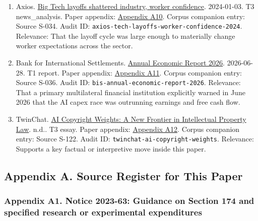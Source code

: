 \documentclass[
  american,
  11pt,
  letterpaper,
]{article}
\begin{document}
\begin{enumerate}
{  A9}. Corpus companion entry: Source S-014. Audit ID:
  \texttt{ap-meta-q4-2023-year-of-efficiency}. Relevance: That Meta's
  improved financial results were publicly tied to both cost cutting and
  layoffs, not just to a magical AI turnaround.
\item
  Axios.
  \href{https://www.axios.com/2024/01/03/tech-layoffs-google-microsoft-employees-impact-anxiety}{Big
  Tech layoffs shattered industry, worker confidence}. 2024-01-03. T3
  news\_analysis. Paper appendix:
  \hyperref[ch-05-appendix-a10-big-tech-layoffs-shattered-industry-worker-confidence]{Appendix
  A10}. Corpus companion entry: Source S-034. Audit ID:
  \texttt{axios-tech-layoffs-worker-confidence-2024}. Relevance: That
  the layoff cycle was large enough to materially change worker
  expectations across the sector.
\item
  Bank for International Settlements.
  \href{https://www.bis.org/publ/arpdf/ar2026e.pdf}{Annual Economic
  Report 2026}. 2026-06-28. T1 report. Paper appendix:
  \hyperref[ch-05-appendix-a11-annual-economic-report-2026]{Appendix
  A11}. Corpus companion entry: Source S-036. Audit ID:
  \texttt{bis-annual-economic-report-2026}. Relevance: That a primary
  multilateral financial institution explicitly warned in June 2026 that
  the AI capex race was outrunning earnings and free cash flow.
\item
  TwinChat.
  \href{https://medium.com/twinchat/ai-copyright-weights-a-new-frontier-in-intellectual-property-law-d8ee1b6c55ee}{AI
  Copyright Weights: A New Frontier in Intellectual Property Law}. n.d..
  T3 essay. Paper appendix:
  \hyperref[ch-05-appendix-a12-ai-copyright-weights-a-new-frontier-in-intellectual-property-law]{Appendix
  A12}. Corpus companion entry: Source S-122. Audit ID:
  \texttt{twinchat-ai-copyright-weights}. Relevance: Supports a key
  factual or interpretive move inside this paper.
\end{enumerate}

\subsection{Appendix A. Source Register for This
Paper}\label{appendix-a.-source-register-for-this-paper-5}

\subsubsection{Appendix A1. Notice 2023-63: Guidance on Section 174 and
specified research or experimental
expenditures}\label{ch-05-appendix-a1-notice-2023-63-guidance-on-section-174-and-specified-research-or-experimental-expenditures}
\end{document}
